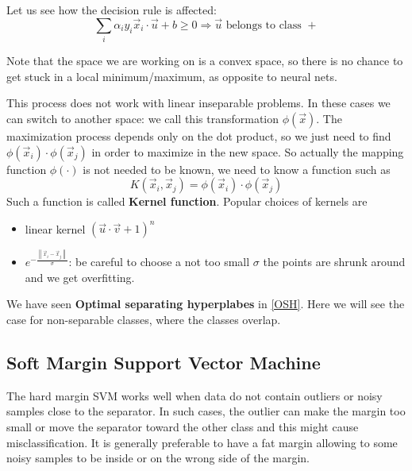 \documentclass[12pt, letterpaper]{article}
\theoremstyle{definition}
\newcommand\norm[1]{\left\lVert#1\right\rVert}
\let\tb\textbf
\begin{document}
Let us see how the decision rule is affected:
\begin{equation}
\sum_i \alpha_i y_i \vec{x}_i \cdot \vec{u} + b \ge 0 \Rightarrow \vec{u} \text{ belongs to class } +
\end{equation}

Note that the space we are working on is a convex space, so there is no chance to get stuck in a local minimum/maximum, as opposite to neural nets.

This process does not work with linear inseparable problems. In these cases we can switch to another space: we call this transformation $\phi(\vec{x})$. The maximization process depends only on the dot product, so we just need to find $\phi(\vec{x}_i)\cdot \phi(\vec{x}_j)$ in order to maximize in the new space. So actually the mapping function $\phi(\cdot)$ is not needed to be known, we need to know a function such as
\begin{equation}
K(\vec{x}_i, \vec{x}_j) = \phi(\vec{x}_i)\cdot \phi(\vec{x}_j)
\end{equation} 
Such a function is called \tb{Kernel function}. Popular choices of kernels are
\begin{itemize}
\item linear kernel $\left(\vec{u} \cdot \vec{v}+1\right)^n$
\item $e^{-\frac{\norm{\vec{x}_i - \vec{x}_j}}{\sigma}}$: be careful to choose a not too small $\sigma$ the points are shrunk around and we get overfitting.
\end{itemize}

We have seen \textbf{Optimal separating hyperplabes} in \ref{OSH}. Here we will see the case for non-separable classes, where the classes overlap.
\subsection{Soft Margin Support Vector Machine}
The hard margin SVM works well when data do not contain outliers or noisy samples close to the separator. In such cases, the outlier can make the margin too small or move the separator toward the other class and this might cause misclassification. It is generally preferable to have a fat margin allowing to some noisy samples to be inside or on the wrong side of the margin.
\end{document}
